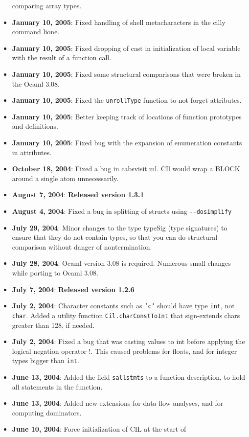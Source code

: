 \documentclass{article}
\def\t#1{{\tt #1}}
\begin{document}
\begin{itemize}
  comparing array types. 
\item {\bf January 10, 2005}: Fixed handling of shell metacharacters in the
  cilly command lione.
\item {\bf January 10, 2005}: Fixed dropping of cast in initialization of
  local variable with the result of a function call.
\item {\bf January 10, 2005}: Fixed some structural comparisons that were
  broken in the Ocaml 3.08.
\item {\bf January 10, 2005}: Fixed the \t{unrollType} function to not forget
  attributes. 
\item {\bf January 10, 2005}: Better keeping track of locations of function
  prototypes and definitions. 
\item {\bf January 10, 2005}: Fixed bug with the expansion of enumeration
  constants in attributes.
\item {\bf October 18, 2004}: Fixed a bug in cabsvisit.ml. CIl would wrap a
  BLOCK around a single atom unnecessarily. 
\item {\bf August 7, 2004}: {\bf Released version 1.3.1}
\item {\bf August 4, 2004}: Fixed a bug in splitting of structs using 
  \t{-{}-dosimplify}
\item {\bf July 29, 2004}: Minor changes to the type typeSig (type signatures)
  to ensure that they do not contain types, so that you can do structural
  comparison without danger of nontermination. 
\item {\bf July 28, 2004}: Ocaml version 3.08 is required. Numerous small 
  changes while porting to Ocaml 3.08. 
\item {\bf July 7, 2004}: {\bf Released version 1.2.6}
\item {\bf July 2, 2004}:  Character constants such as \t{'c'} should
  have type \t{int}, not \t{char}.  Added a utility function
  \t{Cil.charConstToInt} that sign-extends chars greater than 128, if needed.
\item {\bf July 2, 2004}: Fixed a bug that was casting values to int
  before applying the logical negation operator !.  This caused
  problems for floats, and for integer types bigger than \t{int}.
\item {\bf June 13, 2004}: Added the field \t{sallstmts} to a function
  description, to hold all statements in the function.
\item {\bf June 13, 2004}: Added new extensions for data flow analyses, and
  for computing dominators.
\item {\bf June 10, 2004}: Force initialization of CIL at the start of

\end{itemize}
\end{document}
